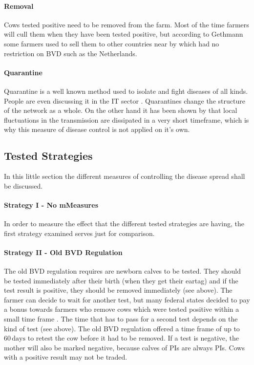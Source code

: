 \paragraph{Removal}
Cows tested positive need to be removed from the farm. Most of the time farmers will cull them when they have been tested positive, but according to Gethmann some farmers used to sell them to other countries near by which had no restriction on BVD such as the Netherlands.

\paragraph{Quarantine}
Quarantine is a well known method used to isolate and fight diseases of all kinds. People are even discussing it in the IT sector \citep{moore2003internet}. Quarantines change the structure of the network as a whole. On the other hand it has been shown by \citep{Keeling20051} that local fluctuations in the transmission are dissipated in a very short timeframe, which is why this measure of disease control is not applied on it's own.

\subsection{Tested Strategies}
In this little section the different measures of controlling the disease spread shall be discussed.
\paragraph{Strategy I - No mMeasures}
In order to measure the effect that the different tested strategies are having, the first strategy examined serves just for comparison.
\paragraph{Strategy II - Old BVD Regulation}
The old BVD regulation requires are newborn calves to be tested. They should be tested immediately after their birth (when they get their eartag) and if the test result is positive, they should be removed immediately (see above). The farmer can decide to wait for another test, but many federal states decided to pay a bonus towards farmers who remove cows which were tested positive within a small time frame \citep{personalCom}. The time that has to pass for a second test depends on the kind of test (see above). The old BVD regulation offered a time frame of up to $60\,\text{days}$ to retest the cow before it had to be removed. 
If a test is negative, the mother will also be marked negative, because calves of PIs are always PIs. Cows with a positive result may not be traded.
